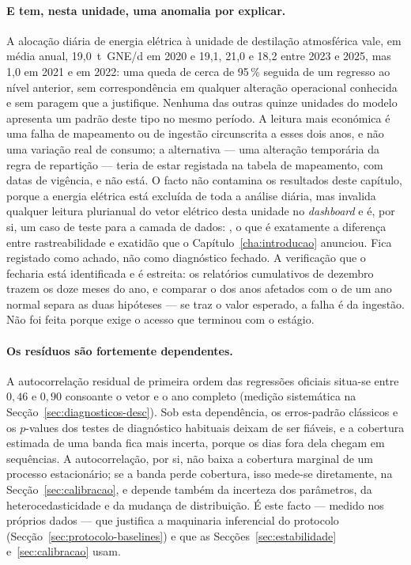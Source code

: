 \paragraph{E tem, nesta unidade, uma anomalia por explicar.} A alocação
diária de energia elétrica à unidade de destilação atmosférica vale, em
média anual, 19,0~t~GNE/d em 2020 e 19,1, 21,0 e 18,2 entre 2023 e 2025,
mas 1,0 em 2021 e em 2022: uma queda de cerca de 95\,\% seguida de um
regresso ao nível anterior, sem correspondência em qualquer alteração
operacional conhecida e sem paragem que a justifique. Nenhuma das outras
quinze unidades do modelo apresenta um padrão deste tipo no mesmo período.
A leitura mais económica é uma falha de mapeamento ou de ingestão
circunscrita a esses dois anos, e não uma variação real de consumo; a
alternativa --- uma alteração temporária da regra de repartição ---
teria de estar registada na tabela de mapeamento, com datas de vigência,
e não está. O facto não contamina os resultados deste capítulo, porque a
energia elétrica está excluída de toda a análise diária, mas invalida
qualquer leitura plurianual do vetor elétrico desta unidade no
\emph{dashboard} e é, por si, um caso de teste para a camada de dados: , o que é exatamente
a diferença entre rastreabilidade e exatidão que o
Capítulo~\ref{cha:introducao} anunciou. Fica registado como achado, não
como diagnóstico fechado. A verificação que o fecharia está identificada e
é estreita: os relatórios cumulativos de dezembro trazem os doze meses do
ano, e comparar o dos anos afetados com o de um ano normal separa as duas
hipóteses ---  se traz o valor esperado, a falha é da ingestão. Não foi
feita porque exige o acesso que terminou com o estágio.


\paragraph{Os resíduos são fortemente dependentes.} A autocorrelação residual
de primeira ordem das regressões oficiais situa-se entre
$0{,}46$ e $0{,}90$
consoante o vetor e o ano completo (medição sistemática na
Secção~\ref{sec:diagnosticos-desc}). Sob esta dependência, os erros-padrão clássicos e
os $p$-values dos testes de diagnóstico habituais deixam de ser fiáveis, e a
cobertura estimada de uma banda fica mais incerta, porque os dias fora dela
chegam em sequências. A autocorrelação, por si, não baixa a cobertura
marginal de um processo estacionário; se a banda perde cobertura, isso
mede-se diretamente, na Secção~\ref{sec:calibracao}, e depende também da
incerteza dos parâmetros, da heterocedasticidade e da mudança de
distribuição. É este facto --- medido nos próprios dados --- que
justifica a maquinaria inferencial do protocolo
(Secção~\ref{sec:protocolo-baselines}) e que as Secções~\ref{sec:estabilidade}
e~\ref{sec:calibracao} usam.

